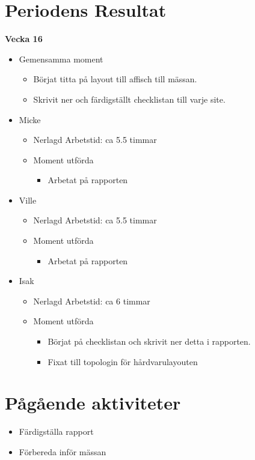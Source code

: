 \section{Periodens Resultat}
\textbf{\LARGE Vecka 16}
\begin{itemize}
\item Gemensamma moment
\begin{itemize}
\item Börjat titta på layout till affisch till mässan.
\item Skrivit ner och färdigställt checklistan till varje site.
\end{itemize}
\item Micke
\begin{itemize}
\item Nerlagd Arbetstid: ca 5.5 timmar
\item Moment utförda
\begin{itemize}
\item Arbetat på rapporten
\end{itemize}
\end{itemize}

\item Ville
\begin{itemize}
\item Nerlagd Arbetstid: ca 5.5 timmar
\item Moment utförda
\begin{itemize}
\item Arbetat på rapporten
\end{itemize}
\end{itemize}

\item Isak
\begin{itemize}
\item Nerlagd Arbetstid: ca 6 timmar
\item Moment utförda
\begin{itemize}
\item Börjat på checklistan och skrivit ner detta i rapporten.
\item Fixat till topologin för hårdvarulayouten
\end{itemize}
\end{itemize}

\end{itemize}



\section{Pågående aktiviteter}
\begin{itemize}
\item Färdigställa rapport
\item Förbereda inför mässan
\end{itemize}
